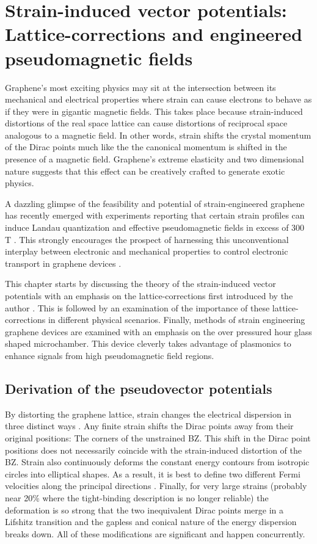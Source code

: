 \chapter{Strain-induced vector potentials: Lattice-corrections and engineered pseudomagnetic fields\label{chap:PVP}}
Graphene's most exciting physics may sit at the intersection between its mechanical and electrical properties where strain can cause electrons to behave as if they were in gigantic magnetic fields.
This takes place because strain-induced distortions of the real space lattice can cause distortions of reciprocal space analogous to a magnetic field.
In other words, strain shifts the crystal momentum of the Dirac points much like the the canonical momentum is shifted in the presence of a magnetic field.
Graphene's extreme elasticity and two dimensional nature suggests that this effect can be creatively crafted to generate exotic physics.

A dazzling glimpse of the feasibility and potential of strain-engineered graphene \cite{Pereira2009a,Guinea2009} has recently emerged with experiments reporting that certain strain profiles can induce Landau quantization and effective pseudomagnetic fields in excess of 300 T \cite{Levy2010,Yan2012,Yeh2011}.
This strongly encourages the prospect of harnessing this unconventional interplay between electronic and mechanical properties to control electronic transport in graphene devices \cite{Pereira2009a,Fogler2008}.

This chapter starts by discussing the theory of the strain-induced vector potentials with an emphasis on the lattice-corrections first introduced by the author \cite{Kitt2012,Kitt2013}.
This is followed by an examination of the importance of these lattice-corrections in different physical scenarios.
Finally, methods of strain engineering graphene devices are examined with an emphasis on the over pressured hour glass shaped microchamber.
This device cleverly takes advantage of plasmonics to enhance signals from high pseudomagnetic field regions.

\section{Derivation of the pseudovector potentials}
By distorting the graphene lattice, strain changes the electrical dispersion in three distinct ways \cite{Pereira2009}.
Any finite strain shifts the Dirac points away from their original positions: The corners of the unstrained BZ.
This shift in the Dirac point positions does not necessarily coincide with the strain-induced distortion of the BZ.
Strain also continuously deforms the constant energy contours from isotropic circles into elliptical shapes.
As a result, it is best to define two different Fermi velocities along the principal directions \cite{Pereira2009,Pereira2010c,Choi2010}.
Finally, for very large strains (probably near 20\% where the tight-binding description is no longer reliable) the deformation is so strong that the two inequivalent Dirac points merge in a Lifshitz transition and the gapless and conical nature of the energy dispersion breaks down.
All of these modifications are significant and happen concurrently. 

